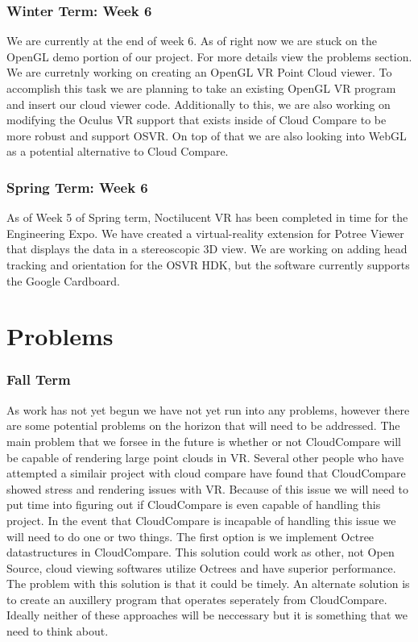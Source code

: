 \documentclass{article}
\begin{document}
\subsubsection{Winter Term: Week 6}

We are currently at the end of week 6. 
As of right now we are stuck on the OpenGL demo portion of our project.
For more details view the problems section.
We are curretnly working on creating an OpenGL VR Point Cloud viewer.
To accomplish this task we are planning to take an existing OpenGL VR program and insert our cloud viewer code.
Additionally to this, we are also working on modifying the Oculus VR support that exists inside of Cloud Compare to be more robust and support OSVR.
On top of that we are also looking into WebGL as a potential alternative to Cloud Compare.

\subsubsection{Spring Term: Week 6}

As of Week 5 of Spring term, Noctilucent VR has been completed in time for the Engineering Expo. 
We have created a virtual-reality extension for Potree Viewer that displays the data in a stereoscopic 3D view. 
We are working on adding head tracking and orientation for the OSVR HDK, but the software currently supports the Google Cardboard. 

\section{Problems}

\subsubsection{Fall Term}

As work has not yet begun we have not yet run into any problems, however there are some potential problems on the horizon that will need to be addressed.
The main problem that we forsee in the future is whether or not CloudCompare will be capable of rendering large point clouds in VR.
Several other people who have attempted a similair project with cloud compare have found that CloudCompare showed stress and rendering issues with VR.
Because of this issue we will need to put time into figuring out if CloudCompare is even capable of handling this project.
In the event that CloudCompare is incapable of handling this issue we will need to do one or two things.
The first option is we implement Octree datastructures in CloudCompare.
This solution could work as other, not Open Source, cloud viewing softwares utilize Octrees and have superior performance.
The problem with this solution is that it could be timely.
An alternate solution is to create an auxillery program that operates seperately from CloudCompare.
Ideally neither of these approaches will be neccessary but it is something that we need to think about.
\end{document}
